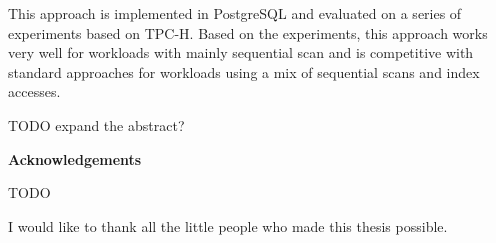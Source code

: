 This approach is implemented in PostgreSQL and evaluated on a series of experiments based on TPC-H. Based on the experiments, this approach works very well for workloads with mainly sequential scan and is competitive with standard approaches for workloads using a mix of sequential scans and index accesses.


TODO expand the abstract?

\cleardoublepage
{}    %

\begin{center}\textbf{Acknowledgements}\end{center}

TODO

I would like to thank all the little people who made this thesis possible.
\cleardoublepage
{}    %




\renewcommand\contentsname{Table of Contents}
\tableofcontents
\cleardoublepage
{}    %

\listoffigures
\cleardoublepage
{}		%


\renewcommand*{\abbreviationsname}{List of Abbreviations}
\printglossary[type=abbreviations]
\cleardoublepage
{}		%




